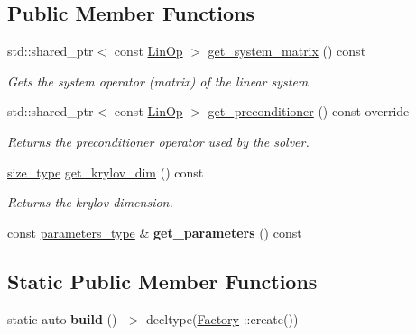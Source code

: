 \subsection*{Public Member Functions}
\begin{DoxyCompactItemize}
\item 
std\+::shared\+\_\+ptr$<$ const \hyperlink{classgko_1_1LinOp}{Lin\+Op} $>$ \hyperlink{classgko_1_1solver_1_1Gmres_a31d5c0225dbed72e52ea252dd38868f2}{get\+\_\+system\+\_\+matrix} () const
\begin{DoxyCompactList}\small\item\em Gets the system operator (matrix) of the linear system. \end{DoxyCompactList}\item 
std\+::shared\+\_\+ptr$<$ const \hyperlink{classgko_1_1LinOp}{Lin\+Op} $>$ \hyperlink{classgko_1_1solver_1_1Gmres_ac2e3e0024a37647eda9f8a7f5b4cefb4}{get\+\_\+preconditioner} () const override
\begin{DoxyCompactList}\small\item\em Returns the preconditioner operator used by the solver. \end{DoxyCompactList}\item 
\hyperlink{namespacegko_a6e5c95df0ae4e47aab2f604a22d98ee7}{size\+\_\+type} \hyperlink{classgko_1_1solver_1_1Gmres_a3a808fe82cdd1e988667a89d6982e740}{get\+\_\+krylov\+\_\+dim} () const
\begin{DoxyCompactList}\small\item\em Returns the krylov dimension. \end{DoxyCompactList}\item 
\mbox{\label{classgko_1_1solver_1_1Gmres_a54a7453e1f9106f5b6d4373ecd1a493f}} 
const \hyperlink{structgko_1_1solver_1_1Gmres_1_1parameters__type}{parameters\+\_\+type} \& {\bfseries get\+\_\+parameters} () const
\end{DoxyCompactItemize}
\subsection*{Static Public Member Functions}
\begin{DoxyCompactItemize}
\item 
\mbox{\label{classgko_1_1solver_1_1Gmres_aedec4e86748b3a46bbd6be9d5a1a8e13}} 
static auto {\bfseries build} () -\/$>$ decltype(\hyperlink{classgko_1_1solver_1_1Gmres_1_1Factory}{Factory} \+::create())
\end{DoxyCompactItemize}
